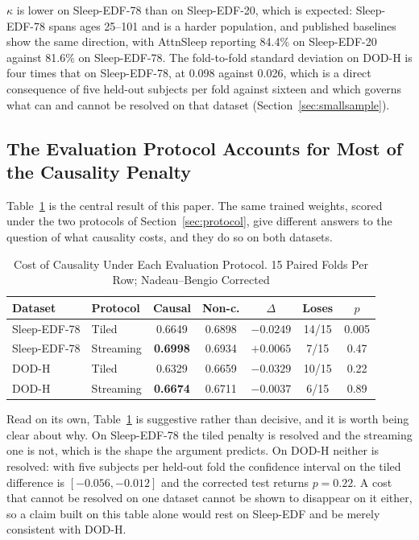 \documentclass[conference]{IEEEtran}
\begin{document}
$\kappa$ is lower on Sleep-EDF-78 than on Sleep-EDF-20, which is expected: Sleep-EDF-78 spans ages
25--101 and is a harder population, and published baselines show the same direction, with AttnSleep
reporting 84.4\% on Sleep-EDF-20 against 81.6\% on Sleep-EDF-78. The fold-to-fold standard
deviation on DOD-H is four times that on Sleep-EDF-78, at 0.098 against 0.026, which is a direct
consequence of five held-out subjects per fold against sixteen and which governs what can and
cannot be resolved on that dataset (Section~\ref{sec:smallsample}).

\subsection{The Evaluation Protocol Accounts for Most of the Causality Penalty}
\label{sec:results-protocol}

Table~\ref{tab:protocol} is the central result of this paper. The same trained weights, scored under
the two protocols of Section~\ref{sec:protocol}, give different answers to the question of what
causality costs, and they do so on both datasets.

\begin{table}[t]
\caption{Cost of Causality Under Each Evaluation Protocol. 15 Paired Folds Per Row;
Nadeau--Bengio Corrected}
\label{tab:protocol}
\centering
\footnotesize
\setlength{\tabcolsep}{4pt}
\begin{tabular}{llccccc}
\toprule
Dataset & Protocol & Causal & Non-c. & $\Delta$ & Loses & $p$ \\
\midrule
Sleep-EDF-78 & Tiled     & 0.6649 & 0.6898 & $-0.0249$ & 14/15 & 0.005 \\
Sleep-EDF-78 & Streaming & \textbf{0.6998} & 0.6934 & $\mathbf{+0.0065}$ & 7/15 & 0.47 \\
\midrule
DOD-H        & Tiled     & 0.6329 & 0.6659 & $-0.0329$ & 10/15 & 0.22 \\
DOD-H        & Streaming & \textbf{0.6674} & 0.6711 & $\mathbf{-0.0037}$ & 6/15 & 0.89 \\
\bottomrule
\end{tabular}
\end{table}

Read on its own, Table~\ref{tab:protocol} is suggestive rather than decisive, and it is worth being
clear about why. On Sleep-EDF-78 the tiled penalty is resolved and the streaming one is not, which
is the shape the argument predicts. On DOD-H neither is resolved: with five subjects per held-out
fold the confidence interval on the tiled difference is $[-0.056, -0.012]$ and the corrected test
returns $p = 0.22$. A cost that cannot be resolved on one dataset cannot be shown to disappear on
it either, so a claim built on this table alone would rest on Sleep-EDF and be merely consistent
with DOD-H.
\end{document}
